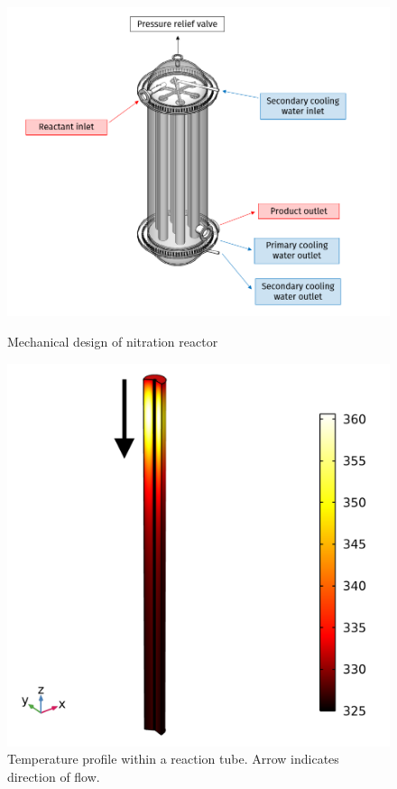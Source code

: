 \begin{figure}[h]
    \centering
    \begin{minipage}[t]{0.53\linewidth}
        \includegraphics[width=0.8\linewidth]{figures/FYD executive sum.PNG}
        \caption{Mechanical design of nitration reactor}
        \label{fig:executivesummaryreactor}
    \end{minipage}\hfill
    \begin{minipage}[t]{0.45\linewidth}
        \includegraphics[width=0.8\linewidth]{chapters/2-reaction/figures/temperature-surface-arrow.png}
        \caption{Temperature profile within a reaction tube. Arrow indicates direction of flow.}
        \label{fig:reactor-comsol}
    \end{minipage}
\end{figure}

